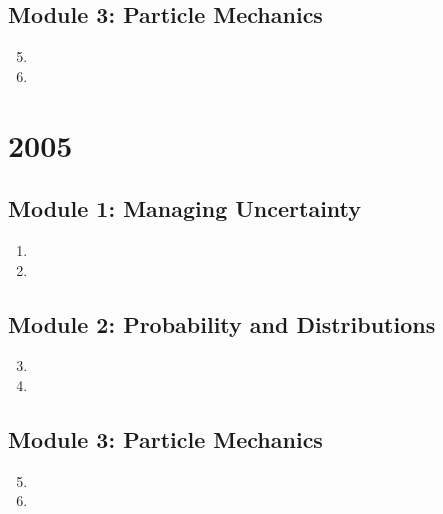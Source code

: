 \documentclass{solutionsmannual}
\begin{document}
\section{Module 3: Particle Mechanics}
\begin{enumerate}[label=\bfseries  \arabic*.]\setcounter{enumi}{4}
\item %
\item %
\end{enumerate}

\chapter{2005}
\section{Module 1: Managing Uncertainty}
\begin{enumerate}[label=\bfseries  \arabic*.]\setcounter{enumi}{0}
\item 
\item 
\end{enumerate}
\section{Module 2: Probability and Distributions}
\begin{enumerate}[label=\bfseries  \arabic*.]\setcounter{enumi}{2}
\item 
\item 
\end{enumerate}
\section{Module 3: Particle Mechanics}
\begin{enumerate}[label=\bfseries  \arabic*.]\setcounter{enumi}{4}
\item 
\item 
\end{enumerate}

\end{document}
